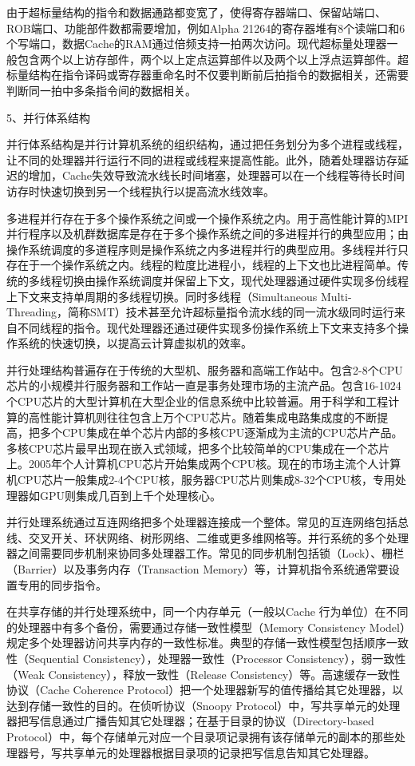 \documentclass[]{ctexbook}
\begin{document}
由于超标量结构的指令和数据通路都变宽了，使得寄存器端口、保留站端口、ROB端口、功能部件数都需要增加，例如Alpha 21264的寄存器堆有8个读端口和6个写端口，数据Cache的RAM通过倍频支持一拍两次访问。现代超标量处理器一般包含两个以上访存部件，两个以上定点运算部件以及两个以上浮点运算部件。超标量结构在指令译码或寄存器重命名时不仅要判断前后拍指令的数据相关，还需要判断同一拍中多条指令间的数据相关。

5、并行体系结构

并行体系结构是并行计算机系统的组织结构，通过把任务划分为多个进程或线程，让不同的处理器并行运行不同的进程或线程来提高性能。此外，随着处理器访存延迟的增加，Cache失效导致流水线长时间堵塞，处理器可以在一个线程等待长时间访存时快速切换到另一个线程执行以提高流水线效率。

多进程并行存在于多个操作系统之间或一个操作系统之内。用于高性能计算的MPI并行程序以及机群数据库是存在于多个操作系统之间的多进程并行的典型应用；由操作系统调度的多道程序则是操作系统之内多进程并行的典型应用。多线程并行只存在于一个操作系统之内。线程的粒度比进程小，线程的上下文也比进程简单。传统的多线程切换由操作系统调度并保留上下文，现代处理器通过硬件实现多份线程上下文来支持单周期的多线程切换。同时多线程（Simultaneous Multi-Threading，简称SMT）技术甚至允许超标量指令流水线的同一流水级同时运行来自不同线程的指令。现代处理器还通过硬件实现多份操作系统上下文来支持多个操作系统的快速切换，以提高云计算虚拟机的效率。

并行处理结构普遍存在于传统的大型机、服务器和高端工作站中。包含2-8个CPU芯片的小规模并行服务器和工作站一直是事务处理市场的主流产品。包含16-1024个CPU芯片的大型计算机在大型企业的信息系统中比较普遍。用于科学和工程计算的高性能计算机则往往包含上万个CPU芯片。随着集成电路集成度的不断提高，把多个CPU集成在单个芯片内部的多核CPU逐渐成为主流的CPU芯片产品。多核CPU芯片最早出现在嵌入式领域，把多个比较简单的CPU集成在一个芯片上。2005年个人计算机CPU芯片开始集成两个CPU核。现在的市场主流个人计算机CPU芯片一般集成2-4个CPU核，服务器CPU芯片则集成8-32个CPU核，专用处理器如GPU则集成几百到上千个处理核心。

并行处理系统通过互连网络把多个处理器连接成一个整体。常见的互连网络包括总线、交叉开关、环状网络、树形网络、二维或更多维网格等。并行系统的多个处理器之间需要同步机制来协同多处理器工作。常见的同步机制包括锁（Lock）、栅栏（Barrier）以及事务内存（Transaction Memory）等，计算机指令系统通常要设置专用的同步指令。

在共享存储的并行处理系统中，同一个内存单元（一般以Cache 行为单位）在不同的处理器中有多个备份，需要通过存储一致性模型（Memory Consistency Model）规定多个处理器访问共享内存的一致性标准。典型的存储一致性模型包括顺序一致性（Sequential Consistency），处理器一致性（Processor Consistency），弱一致性（Weak Consistency），释放一致性（Release Consistency）等。高速缓存一致性协议（Cache Coherence Protocol）把一个处理器新写的值传播给其它处理器，以达到存储一致性的目的。在侦听协议（Snoopy Protocol）中，写共享单元的处理器把写信息通过广播告知其它处理器；在基于目录的协议（Directory-based Protocol）中，每个存储单元对应一个目录项记录拥有该存储单元的副本的那些处理器号，写共享单元的处理器根据目录项的记录把写信息告知其它处理器。
\end{document}
